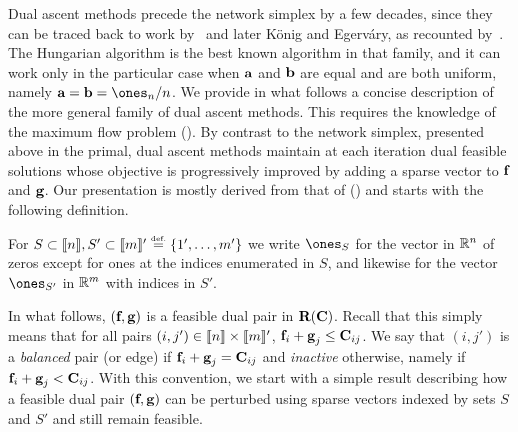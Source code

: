 Dual ascent methods precede the network simplex by a few decades, since they can be traced back to work by~\citet{borchardt1865investigando} and later K\"onig and Egerv\'ary, as recounted by~\citet{Kuhn1955}. The Hungarian algorithm is the best known algorithm in that family, and it can work only in the particular case when $\mathrm{\textbf{a}}$ and $\mathrm{\textbf{b}}$ are equal and are both uniform, namely $\a=\b=\ones_n/n$. We provide in what follows a concise description of the more general family of dual ascent methods. This requires the knowledge of the maximum flow problem (\cite[\S7.5]{bertsimas1997introduction}). By contrast to the network simplex, presented above in the primal, dual ascent methods maintain at each iteration dual feasible solutions whose objective is progressively improved by adding a sparse vector to $\mathrm{\textbf{f}}$ and $\mathrm{\textbf{g}}$. Our presentation is mostly derived from that of (\cite[\S7.7]{bertsimas1997introduction}) and starts with the following definition.

\begin{defn} For $S\subset\range{n},S'\subset\range{m}'\eqdef \{1',\dots,m'\}$ we write $\ones_S$ for the vector in $\mathbb{R}^n$ of zeros except for ones at the indices enumerated in $S$, and likewise for the vector $\ones_{S'}$ in $\mathbb{R}^m$ with indices in $S'$. 
\end{defn}	

In what follows, $(\mathrm{\textbf{f}},\mathrm{\textbf{g}})$ is a feasible dual pair in $\mathrm{\textbf{R}}(\mathrm{\textbf{C}})$. Recall that this simply means that for all pairs $(i,j')\in\llbracket n\rrbracket\times\llbracket m\rrbracket'$, $\mathrm{\textbf{f}}_i+\mathrm{\textbf{g}}_j\leq\mathrm{\textbf{C}}_{ij}$. We say that $(i,j')$ is a \emph{balanced} pair (or edge) if $\mathrm{\textbf{f}}_i+\mathrm{\textbf{g}}_j=\mathrm{\textbf{C}}_{ij}$ and \emph{inactive} otherwise, namely if $\mathrm{\textbf{f}}_i+\mathrm{\textbf{g}}_j<\mathrm{\textbf{C}}_{ij}$. With this convention, we start with a simple result describing how a feasible dual pair $(\mathrm{\textbf{f}},\mathrm{\textbf{g}})$ can be perturbed using sparse vectors indexed by sets $S$ and $S'$ and still remain feasible.
	
